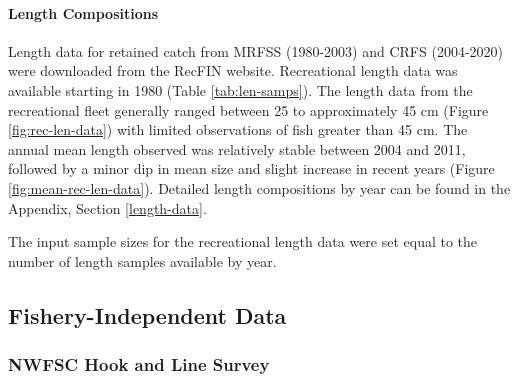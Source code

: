 \documentclass[11pt,
  english,
  a4paper,
]{article}
\begin{document}

\hypertarget{length-compositions-1}{%
\paragraph{Length Compositions}\label{length-compositions-1}}

\leavevmode\tagmcend\tagstructend


Length data for retained catch from MRFSS (1980-2003) and CRFS (2004-2020) were downloaded from the RecFIN website. Recreational length data was available starting in 1980 (Table \ref{tab:len-samps}). The length data from the recreational fleet generally ranged between 25 to approximately 45 cm (Figure \ref{fig:rec-len-data}) with limited observations of fish greater than 45 cm. The annual mean length observed was relatively stable between 2004 and 2011, followed by a minor dip in mean size and slight increase in recent years (Figure \ref{fig:mean-rec-len-data}). Detailed length compositions by year can be found in the Appendix, Section \ref{length-data}.

\leavevmode\tagmcend\tagstructend\par


The input sample sizes for the recreational length data were set equal to the number of length samples available by year.

\leavevmode\tagmcend\tagstructend\par


\hypertarget{fishery-independent-data}{%
\subsection{Fishery-Independent Data}\label{fishery-independent-data}}

\leavevmode\tagmcend\tagstructend


\hypertarget{nwfsc-hook-and-line-survey}{%
\subsubsection{NWFSC Hook and Line Survey}\label{nwfsc-hook-and-line-survey}}
\end{document}
